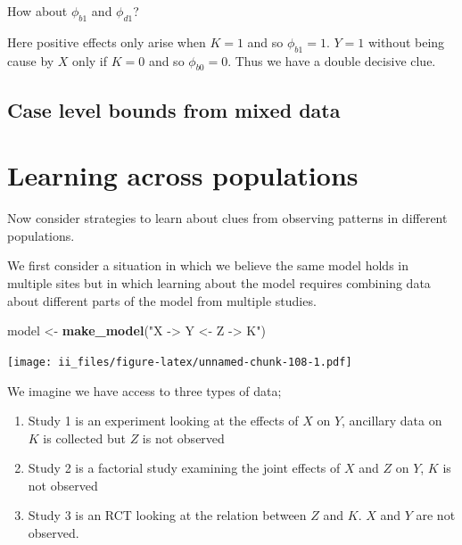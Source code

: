 \documentclass[12pt,]{book}
\newenvironment{Shaded}{\begin{snugshade}}{\end{snugshade}}
\newcommand{\KeywordTok}[1]{\textcolor[rgb]{0.13,0.29,0.53}{\textbf{#1}}}
\newcommand{\NormalTok}[1]{#1}
\newcommand{\StringTok}[1]{\textcolor[rgb]{0.31,0.60,0.02}{#1}}
\providecommand{\tightlist}{%
  \setlength{\itemsep}{0pt}\setlength{\parskip}{0pt}}
\begin{document}
How about \(\phi_{b1}\) and \(\phi_{d1}\)?

Here positive effects only arise when \(K=1\) and so \(\phi_{b1} = 1\). \(Y=1\) without being cause by \(X\) only if \(K=0\) and so \(\phi_{b0} = 0\). Thus we have a double decisive clue.

\hypertarget{case-level-bounds-from-mixed-data}{%
\subsection{Case level bounds from mixed data}\label{case-level-bounds-from-mixed-data}}

\hypertarget{learning-across-populations}{%
\section{Learning across populations}\label{learning-across-populations}}

Now consider strategies to learn about clues from observing patterns in different populations.

We first consider a situation in which we believe the same model holds in multiple sites but in which learning about the model requires combining data about different parts of the model from multiple studies.

\begin{Shaded}
\begin{Highlighting}[]
\NormalTok{model <-}\StringTok{ }\KeywordTok{make_model}\NormalTok{(}\StringTok{"X -> Y <- Z -> K"}\NormalTok{)}
\end{Highlighting}
\end{Shaded}

\texttt{[image: ii\_files/figure-latex/unnamed-chunk-108-1.pdf]}

We imagine we have access to three types of data;

\begin{enumerate}
\def\labelenumi{\arabic{enumi}.}
\tightlist
\item
  Study 1 is an experiment looking at the effects of \(X\) on \(Y\), ancillary data on \(K\) is collected but \(Z\) is not observed
\item
  Study 2 is a factorial study examining the joint effects of \(X\) and \(Z\) on \(Y\), \(K\) is not observed
\item
  Study 3 is an RCT looking at the relation between \(Z\) and \(K\). \(X\) and \(Y\) are not observed.
\end{enumerate}
\end{document}
